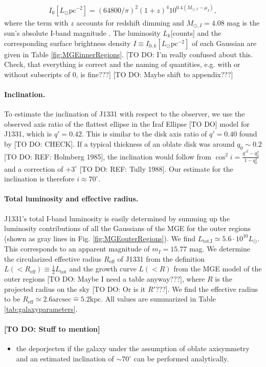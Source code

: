 \begin{eqnarray*}
I_0[L_\odot \text{pc}^{-2}] = \left( 64800/\pi\right)^2 \left(1+z \right)^4 10^{0.4\left(M_{\odot,I}-\mu_I \right)},
\end{eqnarray*}
where the term with $z$ accounts for redshift dimming and $M_{\odot,I}=4.08$ mag is the sun's absolute I-band magnitude \citep{1998gaas.book.....B}. The luminosity $L_k$[counts] and the corresponding surface brightness density $I \equiv I_{0,k}[L_\odot \text{pc}^{-2}]$ of each Gaussian are given in Table \ref{fig:MGEinnerRegions}. [TO DO: I'm really confused about this. Check, that everything is correct and the naming of quantities, e.g. with or without subscripts of 0, is fine???] [TO DO: Maybe shift to appendix???]

\paragraph{Inclination.} To estimate the inclination of J1331 with respect to the observer, we use the observed axis ratio of the flattest ellipse in the Iraf Ellipse [TO DO] model for J1331, which is $q'=0.42$. This is similar to the disk axis ratio of $q' = 0.40$ found by \citet{SWELLSI} [TO DO: CHECK]. If a typical thickness of an oblate disk was around $q_0 \sim 0.2$ [TO DO: REF: Holmberg 1985], the inclination would follow from $\cos^2 i = \frac{q'^2 - q_0^2}{1 - q_0^2}$ and a correction of $+3^\circ$ [TO DO: REF: Tully 1988]. Our estimate for the inclination is therefore $i \approx 70^\circ$.

\paragraph{Total luminosity and effective radius.} J1331's total I-band luminosity is easily determined by summing up the luminosity contributions of all the Gaussians of the MGE for the outer regions (shown as gray lines in Fig. \ref{fig:MGEouterRegions}). We find $L_\text{tot,I} \simeq 5.6 \cdot 10^{10} L_\odot$. This corresponds to an apparent magnitude of $m_I = 15.77$ mag. We determine the circularized effective radius $R_\text{eff}$ of J1331 from the definition $L(<R_\text{eff}) \equiv \frac 12 L_\text{tot}$ and the growth curve $L(<R)$ from the MGE model of the outer regions [TO DO: Maybe I need a table anyway???], where $R$ is the projected radius on the sky [TO DO: Or is it $R'$???]. We find the effective radius to be $R_\text{eff} \simeq 2.6 \text{arcsec} \hat{=} 5.2 \text{kpc}$.  All values are summarized in Table \ref{tab:galaxyparameters}.



\paragraph{[TO DO: Stuff to mention]}
\begin{itemize}
\item the deporjecten if the galaxy under the assumption of oblate axisymmetry and an estimated inclination of $\sim70^\circ$ can be performed analytically.
\end{itemize}


